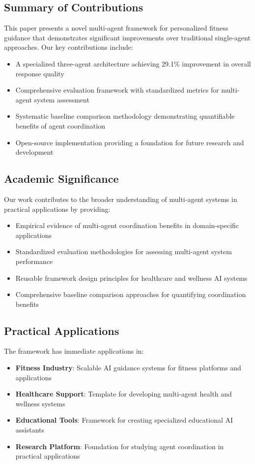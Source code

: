 \documentclass[conference]{IEEEtran}
\begin{document}
\subsection{Summary of Contributions}

This paper presents a novel multi-agent framework for personalized fitness guidance that demonstrates significant improvements over traditional single-agent approaches. Our key contributions include:

\begin{itemize}
\item A specialized three-agent architecture achieving 29.1\% improvement in overall response quality
\item Comprehensive evaluation framework with standardized metrics for multi-agent system assessment
\item Systematic baseline comparison methodology demonstrating quantifiable benefits of agent coordination
\item Open-source implementation providing a foundation for future research and development
\end{itemize}

\subsection{Academic Significance}

Our work contributes to the broader understanding of multi-agent systems in practical applications by providing:

\begin{itemize}
\item Empirical evidence of multi-agent coordination benefits in domain-specific applications
\item Standardized evaluation methodologies for assessing multi-agent system performance
\item Reusable framework design principles for healthcare and wellness AI systems
\item Comprehensive baseline comparison approaches for quantifying coordination benefits
\end{itemize}

\subsection{Practical Applications}

The framework has immediate applications in:

\begin{itemize}
\item \textbf{Fitness Industry}: Scalable AI guidance systems for fitness platforms and applications
\item \textbf{Healthcare Support}: Template for developing multi-agent health and wellness systems
\item \textbf{Educational Tools}: Framework for creating specialized educational AI assistants
\item \textbf{Research Platform}: Foundation for studying agent coordination in practical applications
\end{itemize}
\end{document}

